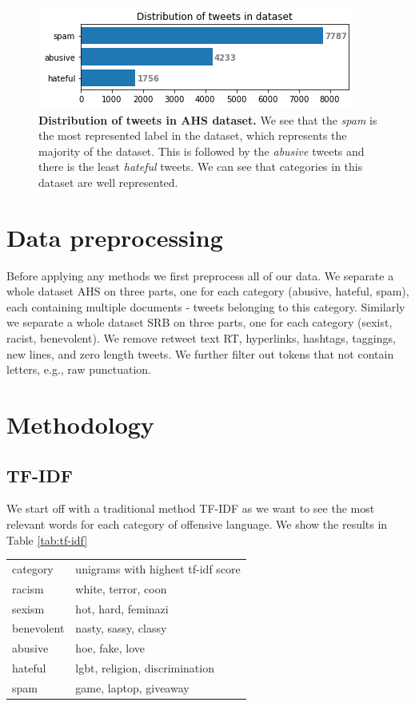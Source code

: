\documentclass[fleqn,moreauthors,10pt]{ds_report}
\begin{document}
\begin{figure}[ht]\centering
	\includegraphics[width=\linewidth]{distribution_tweets_dataset2.png}
	\caption{\textbf{Distribution of tweets in AHS dataset.} We see that the \textit{spam} is the most represented label in the dataset, which represents the majority of the dataset. This is followed by the \textit{abusive} tweets and there is the least \textit{hateful} tweets. We can see that categories in this dataset are well represented.}
	\label{fig:distribution_tweets_dataset2}
\end{figure}

\section*{Data preprocessing}
Before applying any methods we first preprocess all of our data. We separate a whole dataset AHS on three parts, one for each category (abusive, hateful, spam), each containing multiple documents - tweets belonging to this category. Similarly we separate a whole dataset SRB on three parts, one for each category (sexist, racist, benevolent). We remove retweet text RT, hyperlinks, hashtags, taggings, new lines, and zero length tweets. We further filter out tokens that not contain letters, e.g., raw punctuation.

\section*{Methodology}
\subsection*{TF-IDF}
We start off with a traditional method TF-IDF as we want to see the most relevant words for each category of offensive language. We show the results in Table \ref{tab:tf-idf}

\begin{table}[]
\begin{tabular}{ll}
category   & unigrams with highest tf-idf score \\
racism     & white, terror, coon                \\
sexism     & hot, hard, feminazi                \\
benevolent & nasty, sassy, classy               \\
abusive    & hoe, fake, love                    \\
hateful    & lgbt, religion, discrimination     \\
spam       & game, laptop, giveaway            
\end{tabular}
\end{table}
\end{document}
